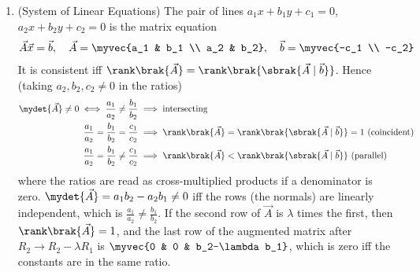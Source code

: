 \begin{enumerate}[label=\thesubsection.\arabic*, ref=\thesubsection.\theenumi,itemsep=1.5em]
\item (System of Linear Equations) The pair of lines $a_1x+b_1y+c_1=0$, $a_2x+b_2y+c_2=0$ is the matrix equation
\begin{align}
\vec{A}\vec{x} = \vec{b}, \quad \vec{A} = \myvec{a_1 & b_1 \\ a_2 & b_2}, \quad \vec{b} = \myvec{-c_1 \\ -c_2}
\label{eq:EE26BTECH11218-cb-linsys}
\end{align}
It is consistent iff $\rank\brak{\vec{A}} = \rank\brak{\sbrak{\vec{A}\mid\vec{b}}}$. Hence (taking $a_2,b_2,c_2\ne0$ in the ratios)
\begin{align}
\mydet{\vec{A}} \ne 0 \iff \frac{a_1}{a_2} \ne \frac{b_1}{b_2} &\implies \text{intersecting} \\
\frac{a_1}{a_2} = \frac{b_1}{b_2} = \frac{c_1}{c_2} &\implies \rank\brak{\vec{A}} = \rank\brak{\sbrak{\vec{A}\mid\vec{b}}} = 1\ \text{(coincident)} \\
\frac{a_1}{a_2} = \frac{b_1}{b_2} \ne \frac{c_1}{c_2} &\implies \rank\brak{\vec{A}} < \rank\brak{\sbrak{\vec{A}\mid\vec{b}}} \text{ (parallel)}
\label{eq:EE26BTECH11218-cb-rank-cases}
\end{align}
where the ratios are read as cross-multiplied products if a denominator is zero.
\solution $\mydet{\vec{A}} = a_1b_2 - a_2b_1 \ne 0$ iff the rows (the normals) are linearly independent, which is $\frac{a_1}{a_2}\ne\frac{b_1}{b_2}$. If the second row of $\vec{A}$ is $\lambda$ times the first, then $\rank\brak{\vec{A}}=1$, and the last row of the augmented matrix after $R_2 \to R_2-\lambda R_1$ is $\myvec{0 & 0 & b_2-\lambda b_1}$, which is zero iff the constants are in the same ratio.


\end{enumerate}
